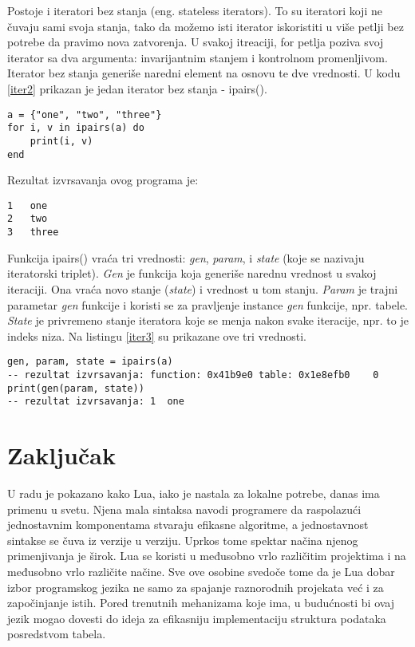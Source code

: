 \documentclass[a4paper]{article}
\begin{document}
Postoje i iteratori bez stanja (eng. stateless iterators). To su iteratori koji ne čuvaju sami svoja stanja, tako da možemo isti iterator iskoristiti u više petlji bez potrebe da pravimo nova zatvorenja. U svakoj itreaciji, for petlja poziva svoj iterator sa dva argumenta: invarijantnim stanjem i kontrolnom promenljivom. Iterator bez stanja generiše naredni element na osnovu te dve vrednosti. U kodu \ref{iter2} prikazan je jedan iterator bez stanja - ipairs()\cite{bookProgInLua}.

\begin{lstlisting}[caption={Primer iteratora bez stanja},frame=single, label=iter2]
a = {"one", "two", "three"}
for i, v in ipairs(a) do
	print(i, v)
end
\end{lstlisting}
Rezultat izvrsavanja ovog programa je:
\begin{verbatim}
1	one
2	two
3	three
\end{verbatim}
Funkcija ipairs() vraća tri vrednosti: \textit{gen}, \textit{param}, i \textit{state} (koje se nazivaju iteratorski triplet). \textit{Gen} je funkcija koja generiše narednu vrednost u svakoj iteraciji. Ona vraća novo stanje (\textit{state}) i vrednost u tom stanju. \textit{Param} je trajni parametar \textit{gen} funkcije i koristi se za pravljenje instance \textit{gen} funkcije, npr. tabele. \textit{State} je privremeno stanje iteratora koje se menja nakon svake iteracije, npr. to je indeks niza\cite{luafun}. Na listingu \ref{iter3} su prikazane ove tri vrednosti.
\begin{lstlisting}[caption={Primer iteratora bez stanja (nastavak)},frame=single, label=iter3]
gen, param, state = ipairs(a)
-- rezultat izvrsavanja: function: 0x41b9e0	table: 0x1e8efb0	0
print(gen(param, state))
-- rezultat izvrsavanja: 1	one
\end{lstlisting}



\section{Zaključak}
\label{sec:zakljucak}

U radu je pokazano kako Lua, iako je nastala za lokalne potrebe, danas ima primenu u svetu. Njena mala sintaksa navodi programere da raspolazući jednostavnim komponentama stvaraju efikasne algoritme, a jednostavnost sintakse se čuva iz verzije u verziju. Uprkos tome spektar načina njenog primenjivanja je širok. Lua se koristi u međusobno vrlo različitim projektima i na međusobno vrlo različite načine. Sve ove osobine svedoče tome da je Lua dobar izbor programskog jezika ne samo za spajanje raznorodnih projekata već i za započinjanje istih. Pored trenutnih mehanizama koje ima, u budućnosti bi ovaj jezik mogao dovesti do ideja za efikasniju implementaciju struktura podataka posredstvom tabela.
\end{document}
